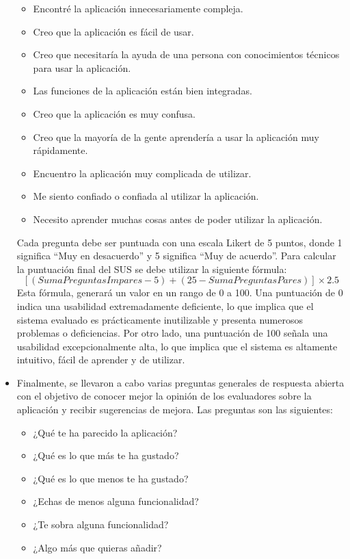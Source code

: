 \begin{itemize}
\begin{itemize}
              \item Encontré la aplicación innecesariamente compleja.
              \item Creo que la aplicación es fácil de usar.
              \item Creo que necesitaría la ayuda de una persona con conocimientos técnicos para usar la aplicación.
              \item Las funciones de la aplicación están bien integradas.
              \item Creo que la aplicación es muy confusa.
              \item Creo que la mayoría de la gente aprendería a usar la aplicación muy rápidamente.
              \item Encuentro la aplicación muy complicada de utilizar.
              \item Me siento confiado o confiada al utilizar la aplicación.
              \item Necesito aprender muchas cosas antes de poder utilizar la aplicación.
          \end{itemize}
          Cada pregunta debe ser puntuada con una escala Likert de 5 puntos, donde 1 significa ``Muy en desacuerdo'' y 5 significa ``Muy de acuerdo''. Para calcular la puntuación final del SUS se debe utilizar la siguiente fórmula:
          \[[(SumaPreguntasImpares - 5) + (25 - SumaPreguntasPares)]\times2.5\]
          Esta fórmula, generará un valor en un rango de 0 a 100. Una puntuación de 0 indica una usabilidad extremadamente deficiente, lo que implica que el sistema evaluado es prácticamente inutilizable y presenta numerosos problemas o deficiencias. Por otro lado, una puntuación de 100 señala una usabilidad excepcionalmente alta, lo que implica que el sistema es altamente intuitivo, fácil de aprender y de utilizar.
    \item Finalmente, se llevaron a cabo varias preguntas generales de respuesta abierta con el objetivo de conocer mejor la opinión de los evaluadores sobre la aplicación y recibir sugerencias de mejora. Las preguntas son las siguientes:
          \begin{itemize}
              \item ¿Qué te ha parecido la aplicación?
              \item ¿Qué es lo que más te ha gustado?
              \item ¿Qué es lo que menos te ha gustado?
              \item ¿Echas de menos alguna funcionalidad?
              \item ¿Te sobra alguna funcionalidad?
              \item ¿Algo más que quieras añadir?
          \end{itemize}
\end{itemize}

